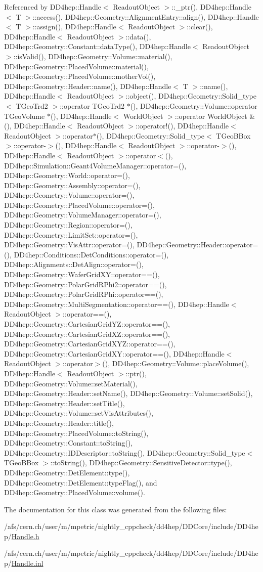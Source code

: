 Referenced by DD4hep::Handle$<$ ReadoutObject $>$::\_\-ptr(), DD4hep::Handle$<$ T $>$::access(), DD4hep::Geometry::AlignmentEntry::align(), DD4hep::Handle$<$ T $>$::assign(), DD4hep::Handle$<$ ReadoutObject $>$::clear(), DD4hep::Handle$<$ ReadoutObject $>$::data(), DD4hep::Geometry::Constant::dataType(), DD4hep::Handle$<$ ReadoutObject $>$::isValid(), DD4hep::Geometry::Volume::material(), DD4hep::Geometry::PlacedVolume::material(), DD4hep::Geometry::PlacedVolume::motherVol(), DD4hep::Geometry::Header::name(), DD4hep::Handle$<$ T $>$::name(), DD4hep::Handle$<$ ReadoutObject $>$::object(), DD4hep::Geometry::Solid\_\-type$<$ TGeoTrd2 $>$::operator TGeoTrd2 $\ast$(), DD4hep::Geometry::Volume::operator TGeoVolume $\ast$(), DD4hep::Handle$<$ WorldObject $>$::operator WorldObject \&(), DD4hep::Handle$<$ ReadoutObject $>$::operator!(), DD4hep::Handle$<$ ReadoutObject $>$::operator$\ast$(), DD4hep::Geometry::Solid\_\-type$<$ TGeoBBox $>$::operator-\/$>$(), DD4hep::Handle$<$ ReadoutObject $>$::operator-\/$>$(), DD4hep::Handle$<$ ReadoutObject $>$::operator$<$(), DD4hep::Simulation::Geant4VolumeManager::operator=(), DD4hep::Geometry::World::operator=(), DD4hep::Geometry::Assembly::operator=(), DD4hep::Geometry::Volume::operator=(), DD4hep::Geometry::PlacedVolume::operator=(), DD4hep::Geometry::VolumeManager::operator=(), DD4hep::Geometry::Region::operator=(), DD4hep::Geometry::LimitSet::operator=(), DD4hep::Geometry::VisAttr::operator=(), DD4hep::Geometry::Header::operator=(), DD4hep::Conditions::DetConditions::operator=(), DD4hep::Alignments::DetAlign::operator=(), DD4hep::Geometry::WaferGridXY::operator==(), DD4hep::Geometry::PolarGridRPhi2::operator==(), DD4hep::Geometry::PolarGridRPhi::operator==(), DD4hep::Geometry::MultiSegmentation::operator==(), DD4hep::Handle$<$ ReadoutObject $>$::operator==(), DD4hep::Geometry::CartesianGridYZ::operator==(), DD4hep::Geometry::CartesianGridXZ::operator==(), DD4hep::Geometry::CartesianGridXYZ::operator==(), DD4hep::Geometry::CartesianGridXY::operator==(), DD4hep::Handle$<$ ReadoutObject $>$::operator$>$(), DD4hep::Geometry::Volume::placeVolume(), DD4hep::Handle$<$ ReadoutObject $>$::ptr(), DD4hep::Geometry::Volume::setMaterial(), DD4hep::Geometry::Header::setName(), DD4hep::Geometry::Volume::setSolid(), DD4hep::Geometry::Header::setTitle(), DD4hep::Geometry::Volume::setVisAttributes(), DD4hep::Geometry::Header::title(), DD4hep::Geometry::PlacedVolume::toString(), DD4hep::Geometry::Constant::toString(), DD4hep::Geometry::IDDescriptor::toString(), DD4hep::Geometry::Solid\_\-type$<$ TGeoBBox $>$::toString(), DD4hep::Geometry::SensitiveDetector::type(), DD4hep::Geometry::DetElement::type(), DD4hep::Geometry::DetElement::typeFlag(), and DD4hep::Geometry::PlacedVolume::volume().

The documentation for this class was generated from the following files:\begin{DoxyCompactItemize}
\item 
/afs/cern.ch/user/m/mpetric/nightly\_\-cppcheck/dd4hep/DDCore/include/DD4hep/\hyperlink{_handle_8h}{Handle.h}\item 
/afs/cern.ch/user/m/mpetric/nightly\_\-cppcheck/dd4hep/DDCore/include/DD4hep/\hyperlink{_handle_8inl}{Handle.inl}\end{DoxyCompactItemize}
